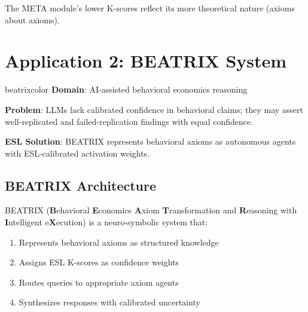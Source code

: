 \documentclass[11pt,a4paper]{article}
\theoremstyle{remark}
\begin{document}
The META module's lower K-scores reflect its more theoretical nature (axioms about axioms).

\section{Application 2: BEATRIX System}
\label{sec:beatrix}

\begin{applicationbox}{beatrixcolor}
\textbf{Domain}: AI-assisted behavioral economics reasoning

\textbf{Problem}: LLMs lack calibrated confidence in behavioral claims; they may assert well-replicated and failed-replication findings with equal confidence.

\textbf{ESL Solution}: BEATRIX represents behavioral axioms as autonomous agents with ESL-calibrated activation weights.
\end{applicationbox}

\subsection{BEATRIX Architecture}

BEATRIX (\textbf{B}ehavioral \textbf{E}conomics \textbf{A}xiom \textbf{T}ransformation and \textbf{R}easoning with \textbf{I}ntelligent e\textbf{X}ecution) is a neuro-symbolic system that:

\begin{enumerate}
    \item Represents behavioral axioms as structured knowledge
    \item Assigns ESL K-scores as confidence weights
    \item Routes queries to appropriate axiom agents
    \item Synthesizes responses with calibrated uncertainty
\end{enumerate}
\end{document}
